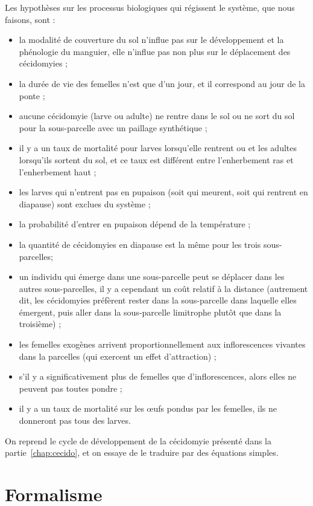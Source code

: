 Les hypothèses sur les processus biologiques qui régissent le système, que nous faisons, sont :
\begin{itemize}
 \item la modalité de couverture du sol n'influe pas sur le développement et la phénologie du manguier, elle n'influe pas non plus sur le déplacement des cécidomyies ;
 \item la durée de vie des femelles n'est que d'un jour, et il correspond au jour de la ponte ;
 \item aucune cécidomyie (larve ou adulte) ne rentre dans le sol ou ne sort du sol pour la sous-parcelle avec un paillage synthétique ;
 \item il y a un taux de mortalité pour larves lorsqu'elle rentrent ou et les adultes lorsqu'ils sortent du sol, et ce taux est différent entre l'enherbement ras et l'enherbement haut ;
 \item les larves qui n'entrent pas en pupaison (soit qui meurent, soit qui rentrent en diapause) sont exclues du système ;
 \item la probabilité d'entrer en pupaison dépend de la température ;
 \item la quantité de cécidomyies en diapause est la même pour les trois sous-parcelles;
 \item un individu qui émerge dans une sous-parcelle peut se déplacer dans les autres sous-parcelles, il y a cependant un coût relatif à la distance (autrement dit, les cécidomyies préfèrent rester dans la sous-parcelle dans laquelle elles émergent, puis aller dans la sous-parcelle limitrophe plutôt que dans la troisième) ;
 \item les femelles exogènes arrivent proportionnellement aux inflorescences vivantes dans la parcelles (qui exercent un effet d'attraction) ;
 \item s’il y a significativement plus de femelles que d’inflorescences, alors elles ne peuvent pas toutes pondre ;  
 \item il y a un taux de mortalité sur les œufs pondus par les femelles, ils ne donneront pas tous des larves.
\end{itemize}

On reprend le cycle de développement de la cécidomyie présenté dans la partie~\ref{chap:cecido}, et on essaye de le traduire par des équations simples.

\section{Formalisme}

